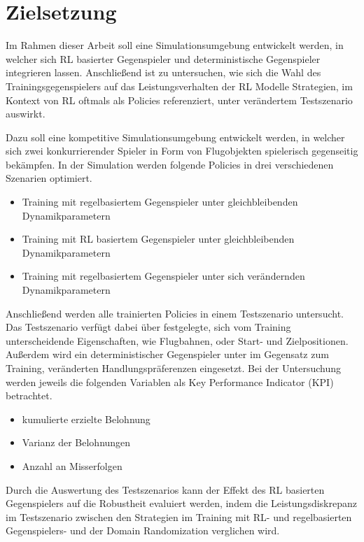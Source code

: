 \section{Zielsetzung}

Im Rahmen dieser Arbeit soll eine Simulationsumgebung entwickelt werden, in welcher sich RL basierter Gegenspieler und deterministische Gegenspieler integrieren lassen.
Anschließend ist zu untersuchen, wie sich die Wahl des Trainingsgegenspielers auf das Leistungsverhalten der RL Modelle Strategien, im Kontext von RL oftmals als Policies referenziert, unter verändertem Testszenario auswirkt.

Dazu soll eine kompetitive Simulationsumgebung entwickelt werden, in welcher sich zwei konkurrierender Spieler in Form von Flugobjekten spielerisch gegenseitig bekämpfen.
In der Simulation werden folgende Policies in drei verschiedenen Szenarien optimiert.

\begin{itemize}
    \item Training mit regelbasiertem Gegenspieler unter gleichbleibenden Dynamikparametern
    \item Training mit RL basiertem Gegenspieler unter gleichbleibenden Dynamikparametern
    \item Training mit regelbasiertem Gegenspieler unter sich verändernden Dynamikparametern
\end{itemize}

Anschließend werden alle trainierten Policies in einem Testszenario untersucht.
Das Testszenario verfügt dabei über festgelegte, sich vom Training unterscheidende Eigenschaften, wie Flugbahnen, oder Start- und Zielpositionen.
Außerdem wird ein deterministischer Gegenspieler unter im Gegensatz zum Training, veränderten Handlungspräferenzen eingesetzt.
Bei der Untersuchung werden jeweils die folgenden Variablen als Key Performance Indicator (KPI) betrachtet.
\begin{itemize}
    \item kumulierte erzielte Belohnung
    \item Varianz der Belohnungen
    \item Anzahl an Misserfolgen
\end{itemize}

Durch die Auswertung des Testszenarios kann der Effekt des RL basierten Gegenspielers auf die Robustheit evaluiert werden, indem die Leistungsdiskrepanz im Testszenario zwischen den Strategien im Training mit RL- und regelbasierten Gegenspielers- und der Domain Randomization verglichen wird.


